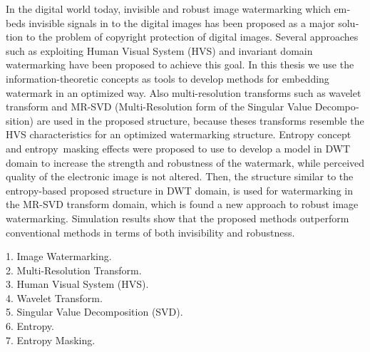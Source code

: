 \thispagestyle{empty}


\phantom{a}
\vfil

\begin{latin}
\centering
\begin{minipage}{0.9\textwidth}
{


\vskip 2mm

\baselineskip
In the digital world today, invisible and robust image watermarking which embeds invisible signals
in to the digital images has been proposed as a major solution to the problem of copyright protection 
of digital images. Several approaches such as exploiting Human Visual System (HVS) and invariant domain
watermarking have been proposed to achieve this goal. In this thesis we use the information-theoretic
concepts as tools to develop methods for embedding watermark in an optimized way. Also multi-resolution 
transforms such as wavelet transform and MR-SVD (Multi-Resolution form of the Singular Value Decomposition)
are used in the proposed structure, because theses transforms resemble the HVS characteristics  for an
optimized watermarking  structure. Entropy concept and entropy~masking effects were proposed to use to develop
a model in DWT domain to increase the strength and robustness of the watermark, while perceived quality
of the electronic image is not altered. 
Then, the structure similar to the entropy-based proposed structure in DWT domain, 
is used for watermarking in the MR-SVD transform domain, which is found a new approach to robust image 
watermarking. Simulation results show that the proposed methods outperform conventional methods
in terms of both invisibility and robustness.  \\
\baselineskip

\vspace{15mm}

\vskip 2mm

{
1. Image Watermarking. \\
2. Multi-Resolution Transform.\\
3. Human Visual System (HVS).\\
4. Wavelet Transform.\\
5. Singular Value Decomposition (SVD).\\
6. Entropy.\\
7. Entropy Masking.\\
}
}
\end{minipage}
\end{latin}
\vfil
  
